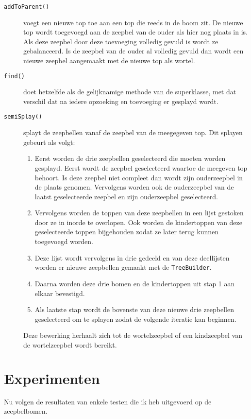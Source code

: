 \documentclass[12pt,hidelinks]{article}
\begin{document}
    \begin{description}
        \item[\tt addToParent()] voegt een nieuwe top toe aan een top die reeds in de boom zit.
            De nieuwe top wordt toegevoegd aan de zeepbel van de ouder als hier nog plaats in is. 
            Als deze zeepbel door deze toevoeging volledig gevuld is wordt ze gebalanceerd. 
            Is de zeepbel van de ouder al volledig gevuld dan wordt een nieuwe zeepbel aangemaakt met de nieuwe top als wortel.
        \item[\tt find()] doet hetzelfde als de gelijknamige methode van de superklasse, met dat verschil dat na iedere opzoeking en toevoeging er gesplayd wordt.
        \item[\tt semiSplay()] splayt de zeepbellen vanaf de zeepbel van de meegegeven top.
            Dit splayen gebeurt als volgt:
            \begin{enumerate}
                \item Eerst worden de drie zeepbellen geselecteerd die moeten worden gesplayd. Eerst wordt de zeepbel geselecteerd waartoe de meegeven top behoort.
                    Is deze zeepbel niet compleet dan wordt zijn ouderzeepbel in de plaats genomen.
                    Vervolgens worden ook de ouderzeepbel van de laatst geselecteerde zeepbel en zijn ouderzeepbel geselecteerd.
                \item Vervolgens worden de toppen van deze zeepbellen in een lijst gestoken door ze in inorde te overlopen.
                    Ook worden de kindertoppen van deze geselecteerde toppen bijgehouden zodat ze later terug kunnen toegevoegd worden.
                \item Deze lijst wordt vervolgens in drie gedeeld en van deze deellijsten worden er nieuwe zeepbellen gemaakt met de {\tt TreeBuilder}.
                \item Daarna worden deze drie bomen en de kindertoppen uit stap 1 aan elkaar bevestigd.
                \item Als laatste stap wordt de bovenste van deze nieuwe drie zeepbellen geselecteerd om te splayen zodat de volgende iteratie kan beginnen.
            \end{enumerate}
            Deze bewerking herhaalt zich tot de wortelzeepbel of een kindzeepbel van de wortelzeepbel wordt bereikt.
            
    \end{description}
    \newpage
    \setcounter{section}{0}
    \part{Experimenten}
    Nu volgen de resultaten van enkele testen die ik heb uitgevoerd op de zeepbelbomen.
\end{document}
